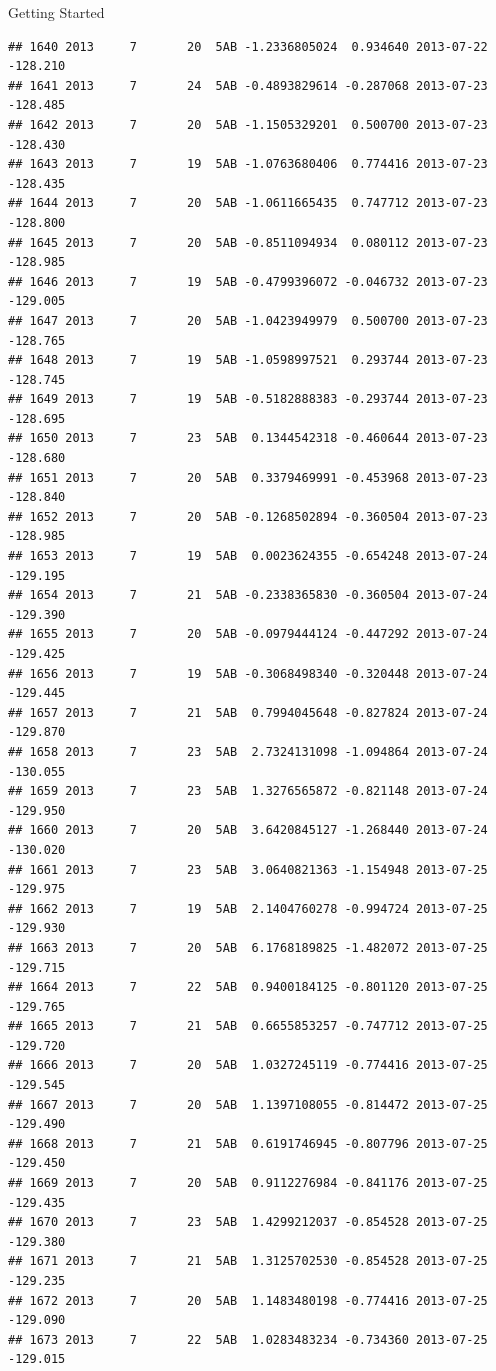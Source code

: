 \documentclass[
  ignorenonframetext,
]{beamer}
\begin{document}
\begin{frame}[fragile]{Getting Started}
\begin{verbatim}
## 1640 2013     7       20  5AB -1.2336805024  0.934640 2013-07-22 -128.210
## 1641 2013     7       24  5AB -0.4893829614 -0.287068 2013-07-23 -128.485
## 1642 2013     7       20  5AB -1.1505329201  0.500700 2013-07-23 -128.430
## 1643 2013     7       19  5AB -1.0763680406  0.774416 2013-07-23 -128.435
## 1644 2013     7       20  5AB -1.0611665435  0.747712 2013-07-23 -128.800
## 1645 2013     7       20  5AB -0.8511094934  0.080112 2013-07-23 -128.985
## 1646 2013     7       19  5AB -0.4799396072 -0.046732 2013-07-23 -129.005
## 1647 2013     7       20  5AB -1.0423949979  0.500700 2013-07-23 -128.765
## 1648 2013     7       19  5AB -1.0598997521  0.293744 2013-07-23 -128.745
## 1649 2013     7       19  5AB -0.5182888383 -0.293744 2013-07-23 -128.695
## 1650 2013     7       23  5AB  0.1344542318 -0.460644 2013-07-23 -128.680
## 1651 2013     7       20  5AB  0.3379469991 -0.453968 2013-07-23 -128.840
## 1652 2013     7       20  5AB -0.1268502894 -0.360504 2013-07-23 -128.985
## 1653 2013     7       19  5AB  0.0023624355 -0.654248 2013-07-24 -129.195
## 1654 2013     7       21  5AB -0.2338365830 -0.360504 2013-07-24 -129.390
## 1655 2013     7       20  5AB -0.0979444124 -0.447292 2013-07-24 -129.425
## 1656 2013     7       19  5AB -0.3068498340 -0.320448 2013-07-24 -129.445
## 1657 2013     7       21  5AB  0.7994045648 -0.827824 2013-07-24 -129.870
## 1658 2013     7       23  5AB  2.7324131098 -1.094864 2013-07-24 -130.055
## 1659 2013     7       23  5AB  1.3276565872 -0.821148 2013-07-24 -129.950
## 1660 2013     7       20  5AB  3.6420845127 -1.268440 2013-07-24 -130.020
## 1661 2013     7       23  5AB  3.0640821363 -1.154948 2013-07-25 -129.975
## 1662 2013     7       19  5AB  2.1404760278 -0.994724 2013-07-25 -129.930
## 1663 2013     7       20  5AB  6.1768189825 -1.482072 2013-07-25 -129.715
## 1664 2013     7       22  5AB  0.9400184125 -0.801120 2013-07-25 -129.765
## 1665 2013     7       21  5AB  0.6655853257 -0.747712 2013-07-25 -129.720
## 1666 2013     7       20  5AB  1.0327245119 -0.774416 2013-07-25 -129.545
## 1667 2013     7       20  5AB  1.1397108055 -0.814472 2013-07-25 -129.490
## 1668 2013     7       21  5AB  0.6191746945 -0.807796 2013-07-25 -129.450
## 1669 2013     7       20  5AB  0.9112276984 -0.841176 2013-07-25 -129.435
## 1670 2013     7       23  5AB  1.4299212037 -0.854528 2013-07-25 -129.380
## 1671 2013     7       21  5AB  1.3125702530 -0.854528 2013-07-25 -129.235
## 1672 2013     7       20  5AB  1.1483480198 -0.774416 2013-07-25 -129.090
## 1673 2013     7       22  5AB  1.0283483234 -0.734360 2013-07-25 -129.015

\end{verbatim}
\end{frame}
\end{document}
